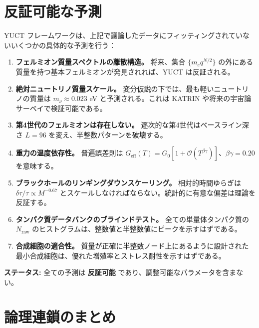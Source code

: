 \documentclass[12pt,a4paper]{article}
\begin{document}
	\section{反証可能な予測}
	\label{sec:predictions}
	
	YUCT フレームワークは、上記で議論したデータにフィッティングされていないいくつかの具体的な予測を行う：
	
	\begin{enumerate}
		\item \textbf{フェルミオン質量スペクトルの離散構造。} 将来、集合 \(\{m_e q^{N/2}\}\) の外にある質量を持つ基本フェルミオンが発見されれば、YUCT は反証される。
		\item \textbf{絶対ニュートリノ質量スケール。} 変分仮説の下では、最も軽いニュートリノの質量は \(m_{\nu} \approx 0.023\) eV と予測される。これは KATRIN や将来の宇宙論サーベイで検証可能である。
		\item \textbf{第4世代のフェルミオンは存在しない。} 逐次的な第4世代はベースライン深さ \(L = 96\) を変え、半整数パターンを破壊する。
		\item \textbf{重力の温度依存性。} 普遍誤差則は \(G_{\mathrm{eff}}(T) = G_0[1 + \mathcal{O}(T^{\beta\gamma})]\)、\(\beta\gamma = 0.20\) を意味する。
		\item \textbf{ブラックホールのリンギングダウンスケーリング。} 相対的時間ゆらぎは \(\delta\tau/\tau \propto M^{-0.67}\) とスケールしなければならない。統計的に有意な偏差は理論を反証する。
		\item \textbf{タンパク質データバンクのブラインドテスト。} 全ての単量体タンパク質の \(N_{\mathrm{raw}}\) のヒストグラムは、整数値と半整数値にピークを示すはずである。
		\item \textbf{合成細胞の適合性。} 質量が正確に半整数ノード上にあるように設計された最小合成細胞は、優れた増殖率とストレス耐性を示すはずである。
	\end{enumerate}
	
	\textbf{ステータス:} 全ての予測は \textbf{反証可能} であり、調整可能なパラメータを含まない。
	
	\section*{論理連鎖のまとめ}
	
\end{document}
